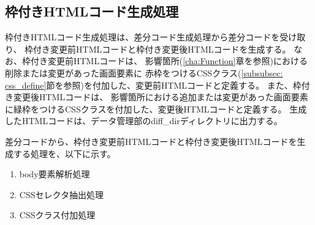 
\subsection{枠付きHTMLコード生成処理}\label{subsec:modified_html_generate}
枠付きHTMLコード生成処理は、差分コード生成処理から差分コードを受け取り、
枠付き変更前HTMLコードと枠付き変更後HTMLコードを生成する。
なお、枠付き変更前HTMLコードは、
影響箇所(\ref{cha:Function}章を参照)における削除または変更があった画面要素に
赤枠をつけるCSSクラス(\ref{subsubsec: css_define}節を参照)を付加した、変更前HTMLコードと定義する。
また、枠付き変更後HTMLコードは、
影響箇所における追加または変更があった画面要素に緑枠をつけるCSSクラスを付加した、変更後HTMLコードと定義する。
生成したHTMLコードは、データ管理部のdiff\_dirディレクトリに出力する。
\par
差分コードから、枠付き変更前HTMLコードと枠付き変更後HTMLコードを生成する処理を、以下に示す。
\begin{enumerate}
    \item body要素解析処理
    \item CSSセレクタ抽出処理
    \item CSSクラス付加処理
\end{enumerate}

